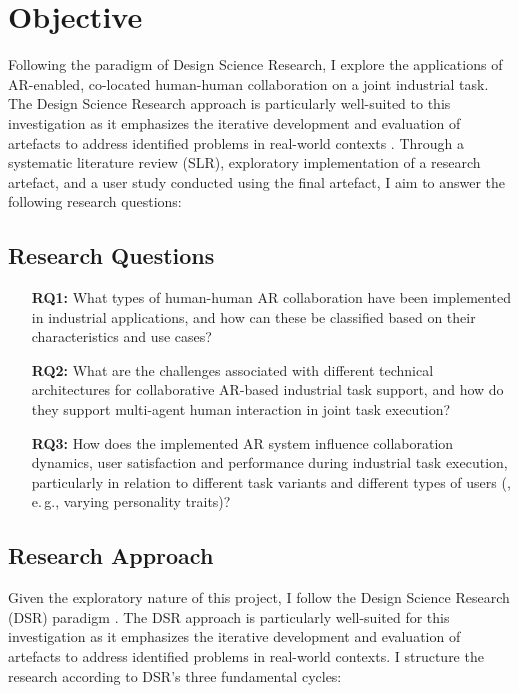 \section{Objective}
Following the paradigm of Design Science Research\cite{hevner2007dsr}, I explore the applications of AR-enabled, co-located human-human collaboration on a joint industrial task. The Design Science Research approach is particularly well-suited to this investigation as it emphasizes the iterative development and evaluation of artefacts to address identified problems in real-world contexts \cite{hevner2007dsr}. Through a systematic literature review (SLR), exploratory implementation of a research artefact, and a user study conducted using the final artefact, I aim to answer the following research questions:

\subsection{Research Questions}
\begin{enumerate}
    \item[\textbf{RQ1:}] What types of human-human AR collaboration have been implemented in industrial applications, and how can these be classified based on their characteristics and use cases?
    
    \item[\textbf{RQ2:}] What are the challenges associated with different technical architectures for collaborative AR-based industrial task support, and how do they support multi-agent human interaction in joint task execution?
    
    \item[\textbf{RQ3:}] How does the implemented AR system influence collaboration dynamics, user satisfaction and performance during industrial task execution, particularly in relation to different task variants and different types of users (, e.\,g., varying personality traits)?
\end{enumerate}

\subsection{Research Approach}
Given the exploratory nature of this project, I follow the Design Science Research (DSR) paradigm \cite{hevner2007dsr}. The DSR approach is particularly well-suited for this investigation as it emphasizes the iterative development and evaluation of artefacts to address identified problems in real-world contexts. I structure the research according to DSR's three fundamental cycles:

